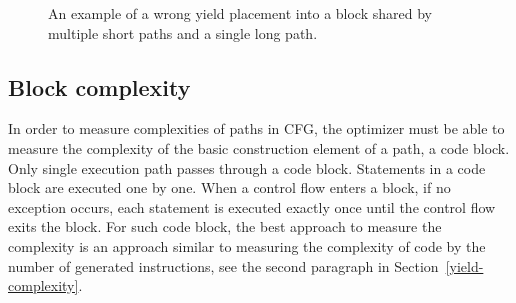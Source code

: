 \begin{figure}[h!]
\caption{An example of a wrong yield placement into a block shared by multiple short paths and a single long path.}
\label{yield-wrong1}
\centering
\vspace{0.5cm}
\end{figure}

\subsection{Block complexity}
In order to measure complexities of paths in CFG, the optimizer must be able to measure the complexity of the basic construction element of a path, a code block. Only single execution path passes through a code block. Statements in a code block are executed one by one. When a control flow enters a block, if no exception occurs, each statement is executed exactly once until the control flow exits the block. For such code block, the best approach to measure the complexity is an approach similar to measuring the complexity of code by the number of generated instructions, see the second paragraph in Section~\ref{yield-complexity}.

